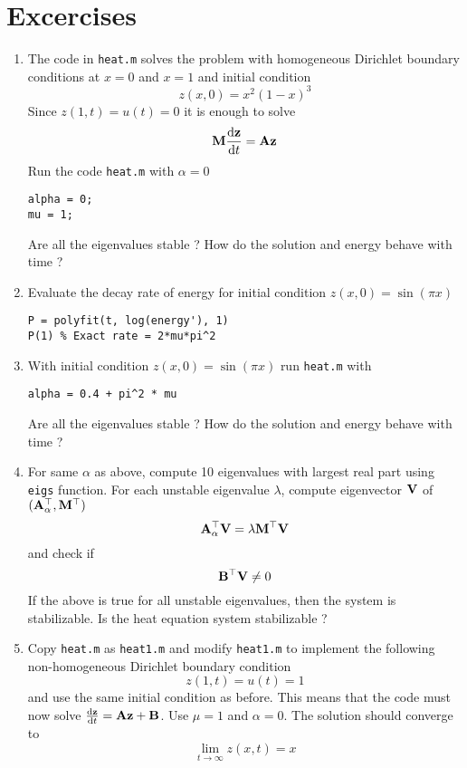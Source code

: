 \documentclass[12pt]{article}
\begin{document}
\section{Excercises}
\begin{enumerate}
\item The code in {\tt heat.m} solves the problem with homogeneous Dirichlet boundary conditions at $x=0$ and $x=1$ and initial condition
\[
z(x,0) = x^2 (1-x)^3
\]
Since $z(1,t) = u(t) = 0$ it is enough to solve
\[
{\mathbf M} \frac{\textrm{d} {\mathbf z}}{\textrm{d} t} = {\mathbf A} {\mathbf z}
\]
Run the code {\tt heat.m} with $\alpha =0$
\begin{lstlisting}
alpha = 0; 
mu = 1;
\end{lstlisting}
Are all the eigenvalues stable ? How do the solution and energy behave with time ?

\item Evaluate the decay rate of energy for initial condition $z(x,0) = \sin(\pi x)$
\begin{lstlisting}
P = polyfit(t, log(energy'), 1)
P(1) % Exact rate = 2*mu*pi^2
\end{lstlisting}
      
\item With initial condition $z(x,0) = \sin(\pi x)$ run {\tt heat.m} with
\begin{lstlisting}
alpha = 0.4 + pi^2 * mu
\end{lstlisting}
Are all the eigenvalues stable ? How do the solution and energy behave with time ?

\item For same $\alpha$ as above, compute 10 eigenvalues with largest real part using {\tt eigs} function. For each unstable eigenvalue $\lambda$, compute eigenvector ${\mathbf V}$ of $({\mathbf A}_\alpha^\top,{\mathbf M}^\top)$
\[
 {\mathbf A}_\alpha^\top {\mathbf V} = \lambda {\mathbf M}^\top {\mathbf V}
\]
and check if 
\[
 {\mathbf B}^\top {\mathbf V} \ne 0
\]
If the above is true for all unstable eigenvalues, then the system is stabilizable. Is the heat equation system stabilizable ?

\item Copy {\tt heat.m} as {\tt heat1.m} and modify {\tt heat1.m} to implement the following non-homogeneous Dirichlet boundary condition
\[
z(1,t) = u(t) = 1
\]
and use the same initial condition as before. This means that the code must now solve $\frac{\textrm{d} {\mathbf z}}{\textrm{d} t}={\mathbf A} {\mathbf z} + {\mathbf B}$. Use $\mu=1$ and $\alpha=0$. The solution should converge to
\[
\lim_{t \to \infty} z(x,t) = x
\]

\end{enumerate}

\end{document}

